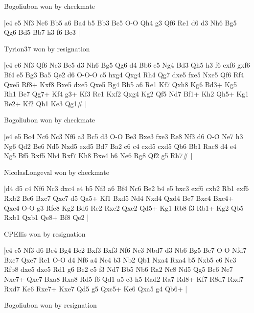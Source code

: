 \showboard

Bogoliubon won by checkmate

\makegametitle
|e4 e5 Nf3 Nc6 Bb5 a6 Ba4 b5 Bb3 Bc5 O-O Qh4 g3 Qf6 Re1 d6 d3 Nh6 Bg5 Qg6 Bd5 Bb7 h3 f6 Be3  |

\showboard

Tyrion37 won by resignation

\makegametitle
|e4 e6 Nf3 Qf6 Nc3 Bc5 d3 Nh6 Bg5 Qg6 d4 Bb6 e5 Ng4 Bd3 Qh5 h3 f6 exf6 gxf6 Bf4 e5 Bg3 Ba5 Qe2 d6 O-O-O c5 hxg4 Qxg4 Rh4 Qg7 dxe5 fxe5 Nxe5 Qf6 Rf4 Qxe5 Rf8+ Kxf8 Bxe5 dxe5 Qxe5 Bg4 Bb5 a6 Re1 Kf7 Qxh8 Kg6 Bd3+ Kg5 Rh1 Bc7 Qg7+ Kf4 g3+ Kf3 Re1 Kxf2 Qxg4 Kg2 Qf5 Nd7 Bf1+ Kh2 Qh5+ Kg1 Be2+ Kf2 Qh1 Ke3 Qg1\#  |

\showboard

Bogoliubon won by checkmate

\makegametitle
|e4 e5 Bc4 Nc6 Nc3 Nf6 a3 Bc5 d3 O-O Be3 Bxe3 fxe3 Re8 Nf3 d6 O-O Ne7 h3 Ng6 Qd2 Be6 Nd5 Nxd5 exd5 Bd7 Ba2 c6 c4 cxd5 cxd5 Qb6 Bb1 Rac8 d4 e4 Ng5 Bf5 Rxf5 Nh4 Rxf7 Kh8 Bxe4 h6 Ne6 Rg8 Qf2 g5 Rh7\#  |

\showboard

NicolasLongeval won by checkmate

\makegametitle
|d4 d5 c4 Nf6 Nc3 dxc4 e4 b5 Nf3 a6 Bf4 Nc6 Be2 b4 e5 bxc3 exf6 cxb2 Rb1 exf6 Rxb2 Be6 Bxc7 Qxc7 d5 Qa5+ Kf1 Bxd5 Nd4 Nxd4 Qxd4 Be7 Bxc4 Bxc4+ Qxc4 O-O g3 Rfe8 Kg2 Bd6 Re2 Rxe2 Qxe2 Qd5+ Kg1 Rb8 f3 Rb1+ Kg2 Qb5 Rxb1 Qxb1 Qe8+ Bf8 Qe2  |

\showboard

CPEllis won by resignation

\makegametitle
|e4 e5 Nf3 d6 Bc4 Bg4 Be2 Bxf3 Bxf3 Nf6 Nc3 Nbd7 d3 Nb6 Bg5 Be7 O-O Nfd7 Bxe7 Qxe7 Re1 O-O d4 Nf6 a4 Nc4 b3 Nb2 Qb1 Nxa4 Rxa4 b5 Nxb5 c6 Nc3 Rfb8 dxe5 dxe5 Rd1 g6 Be2 c5 f3 Nd7 Bb5 Nb6 Ra2 Nc8 Nd5 Qg5 Bc6 Ne7 Nxe7+ Qxe7 Bxa8 Rxa8 Rd5 f6 Qd1 a5 c3 h5 Rad2 Ra7 Rd8+ Kf7 R8d7 Rxd7 Rxd7 Ke6 Rxe7+ Kxe7 Qd5 g5 Qxc5+ Ke6 Qxa5 g4 Qb6+  |

\showboard

Bogoliubon won by resignation

